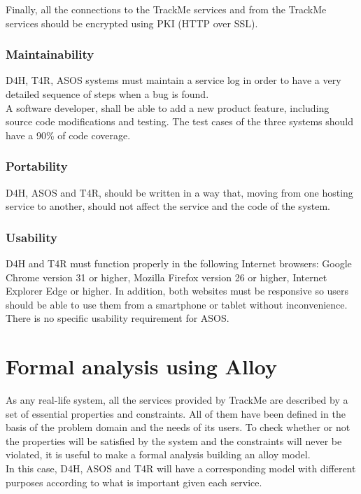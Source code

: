 \documentclass[a4paper, hidelinks, 12pt]{report}
\begin{document}
	Finally, all the connections to the TrackMe services and from the TrackMe services should be encrypted using PKI (HTTP over SSL).
	
	\subsection{Maintainability}
	D4H, T4R, ASOS systems must maintain a service log in order to have a very detailed sequence of steps when a bug is found.\\
	
	A software developer, shall be able to add a new product feature, including source code modifications and testing. The test cases of the three systems should have a 90\% of code coverage.
	
	\subsection{Portability}
	D4H, ASOS and T4R, should be written in a way that, moving from one hosting service to another, should not affect the service and the code of the system.
	
	\subsection{Usability}
	D4H and T4R must function properly in the following Internet browsers: Google Chrome version 31 or higher, Mozilla Firefox version 26 or higher, Internet Explorer Edge or higher. In addition, both websites must be responsive so users should be able to use them from a smartphone or tablet without inconvenience.\\
	
	There is no specific usability requirement for ASOS.
	
	\chapter{Formal analysis using Alloy}
	As any real-life system, all the services provided by TrackMe are described by a set of essential properties and constraints. All of them have been defined in the basis of the problem domain and the needs of its users. To check whether or not the properties will be satisfied by the system and the constraints will never be violated, it is useful to make a formal analysis building an alloy model.\\

In this case, D4H, ASOS and T4R will have a corresponding model with different purposes according to what is important given each service. 
\end{document}
